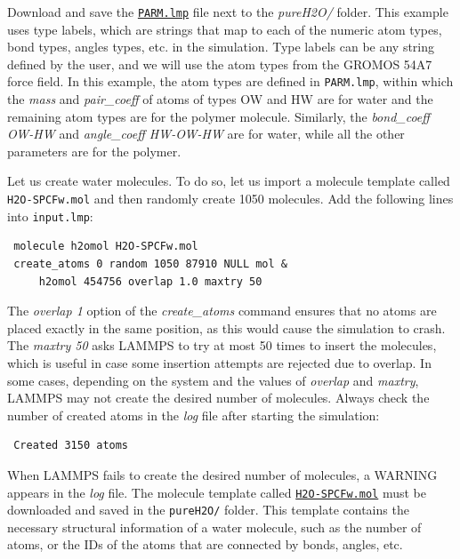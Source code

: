 \documentclass[9pt,tutorial]{livecoms}
\newcommand{\flrcmd}[1]{\textcolor{command}{\texttt{#1}}} %
\newcommand{\flecmd}[1]{\textcolor{command}{\texttt{#1}}} %
\newcommand{\dwlcmd}[1]{\textcolor{download}{\texttt{#1}}} %
\newcommand{\filepath}{https://raw.githubusercontent.com/lammpstutorials/lammpstutorials-article/main/files/}
\begin{document}
Download and save the
\href{\filepath tutorial3/PARM.lmp}{\dwlcmd{PARM.lmp}}
file next to the \textit{pureH2O/} folder. This example uses type labels, which
are strings that map to each of the numeric atom types, bond types, angles types,
etc. in the simulation. Type labels can be any string defined by the user, and we
will use the atom types from the GROMOS 54A7 force field. In this example, the atom
types are defined in \flecmd{PARM.lmp}, within which the \textit{mass}
and \textit{pair\_coeff} of atoms of types OW and HW are for water and the remaining
atom types are for the polymer molecule. Similarly, the \textit{bond\_coeff OW-HW}
and \textit{angle\_coeff HW-OW-HW} are for water, while all the other parameters
are for the polymer.

Let us create water molecules. To do so, let us import a molecule template called
\flecmd{H2O-SPCFw.mol} and then randomly create 1050 molecules. Add the following
lines into \flecmd{input.lmp}:
\begin{lstlisting}
 molecule h2omol H2O-SPCFw.mol
 create_atoms 0 random 1050 87910 NULL mol &
     h2omol 454756 overlap 1.0 maxtry 50
\end{lstlisting}
The \textit{overlap 1} option of the \textit{create\_atoms} command ensures
that no atoms are placed exactly in the same position, as this would cause the
simulation to crash. The \textit{maxtry 50} asks LAMMPS to try at most 50 times
to insert the molecules, which is useful in case some insertion attempts are
rejected due to overlap. In some cases, depending on the system and the values
of \textit{overlap} and \textit{maxtry}, LAMMPS may not create the desired number
of molecules. Always check the number of created atoms in the \textit{log} file
after starting the simulation:
\begin{lstlisting}
 Created 3150 atoms
\end{lstlisting}
When LAMMPS fails to create the desired number of molecules, a WARNING appears
in the \textit{log} file. The molecule template called
\href{\filepath tutorial3/pureH2O/H2O-SPCFw.mol}{\dwlcmd{H2O-SPCFw.mol}}
must be downloaded and saved in the \flrcmd{pureH2O/} folder. This template contains
the necessary structural information of a water molecule, such as the number of
atoms, or the IDs of the atoms that are connected by bonds, angles, etc.
\end{document}
